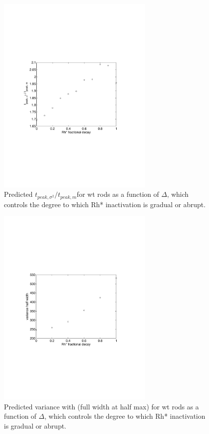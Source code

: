 \documentclass[12pt]{article}
\def\tpeakratio{$t_{peak, \sigma^2} / t_{peak, m}$}
\begin{document}
\begin{figure}[h]
\begin{center}
\includegraphics[width=3in]{decay-shape.pdf}
\caption{Predicted \tpeakratio for wt rods as a function of $\Delta$, which controls the degree to which Rh* inactivation is gradual or abrupt.}
\label{fig:decay-shape}
\end{center}
\end{figure}

\begin{figure}[h]
\begin{center}
\includegraphics[width=3in]{decay-var-width.pdf}
\caption{Predicted variance with (full width at half max) for wt rods as a function of $\Delta$, which controls the degree to which Rh* inactivation is gradual or abrupt.}
\label{fig:decay-shape}
\end{center}
\end{figure}
\end{document}
